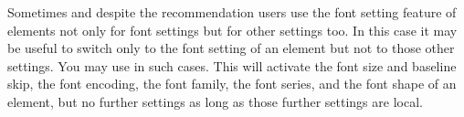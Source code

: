 \fi %
\ifIgnoreThis %
\else %
%
%
%

\begin{Declaration}
  \\
  \\
  \\
  \\
  \\
\end{Declaration}
%
%
%
%
%
%
Sometimes and despite the recommendation
users use the font setting feature of elements not only for font settings but
for other settings too. In this case it may be useful to switch only to the
font setting of an element but not to those other settings. You may use
 in such cases. This will activate the font size and
baseline skip, the font encoding, the font family, the font series, and the
font shape of an element, but no further settings as long as those further
settings are local.

